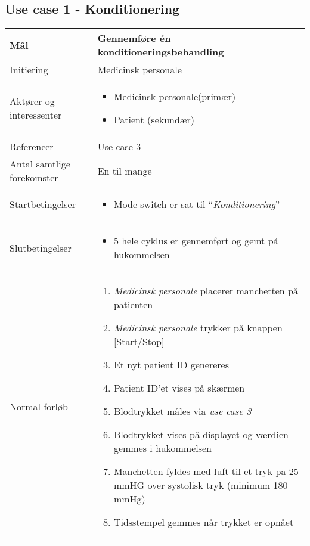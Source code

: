 \subsection{Use case 1 - Konditionering}
\begin{center}
		\begin{longtable}{ | p{} | p{}| } 
			\hline
			Mål & Gennemføre én konditioneringsbehandling  \\ 
			\hline
			Initiering &  Medicinsk personale\\
			\hline
			Aktører og interessenter & 
			\begin{itemize}
				\item Medicinsk personale(primær)
				\item Patient (sekundær)
			\end{itemize} \\ 
			\hline
			Referencer & Use case 3 \\ 
			\hline
			Antal samtlige forekomster & En til mange\\ 
			\hline	
			Startbetingelser & 
			\begin{itemize}
				\item Mode switch er sat til “\textit{Konditionering}”
			\end{itemize} \\ 
			\hline
			Slutbetingelser & 
			\begin{itemize}
				\item 5 hele cyklus er gennemført og gemt på hukommelsen
			\end{itemize} \\ 
			\hline
			Normal forløb & \begin{enumerate}
				\setlength\itemsep{0cm} %
				\item \textit{Medicinsk personale} placerer manchetten på patienten
				\item \textit{Medicinsk personale} trykker på knappen [Start/Stop]
				\item Et nyt patient ID genereres
				\subitem[Undtagelse \#1] 
				\item Patient ID’et vises på skærmen
				\item Blodtrykket måles via \textit{use case 3}
				\subitem[Undtagelse \#2]
				\item Blodtrykket vises på displayet og værdien gemmes i hukommelsen
				\item Manchetten fyldes med luft til et tryk på 25 mmHG over systolisk tryk (minimum 180 mmHg)					
				\item Tidsstempel gemmes når trykket er opnået

\end{enumerate}
\end{longtable}
\end{center}
